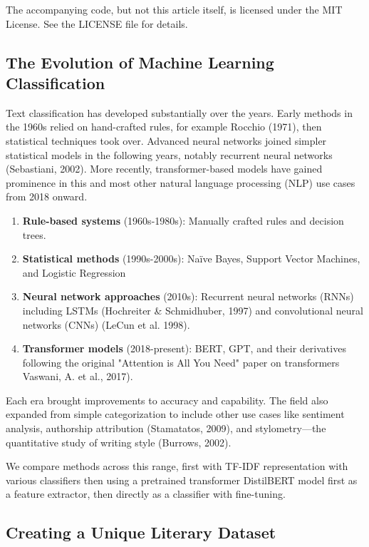 \documentclass[
]{article}
\begin{document}
The accompanying code, but not this article itself, is licensed under the
MIT License. See the LICENSE file for details.

\subsection{The Evolution of Machine Learning
Classification}\label{the-evolution-of-machine-learning-classification}

Text classification has developed substantially over the years. Early
methods in the 1960s relied on hand-crafted rules, for example Rocchio
(1971), then statistical techniques took over. Advanced neural networks
joined simpler statistical models in the following years, notably
recurrent neural networks (Sebastiani, 2002). More recently,
transformer-based models have gained prominence in this and most other
natural language processing (NLP) use cases from 2018 onward.

\begin{enumerate}
\def\labelenumi{\arabic{enumi}.}
\item
  \textbf{Rule-based systems} (1960s-1980s): Manually crafted rules and
  decision trees.
\item
  \textbf{Statistical methods} (1990s-2000s): Naïve Bayes, Support
  Vector Machines, and Logistic Regression
\item
  \textbf{Neural network approaches} (2010s): Recurrent neural networks
  (RNNs) including LSTMs (Hochreiter \& Schmidhuber, 1997) and
  convolutional neural networks (CNNs) (LeCun et al. 1998).
\item
  \textbf{Transformer models} (2018-present): BERT, GPT, and their
  derivatives following the original "Attention is All You Need" paper
  on transformers Vaswani, A. et al., 2017).
\end{enumerate}

Each era brought improvements to accuracy and capability. The field also
expanded from simple categorization to include other use cases like
sentiment analysis, authorship attribution (Stamatatos, 2009), and
stylometry---the quantitative study of writing style (Burrows, 2002).

We compare methods across this range, first with TF-IDF representation with various classifiers then using a pretrained transformer DistilBERT model first as a feature extractor, then directly as a classifier with fine-tuning.

\subsection{Creating a Unique Literary
Dataset}\label{creating-a-unique-literary-dataset}
\end{document}

